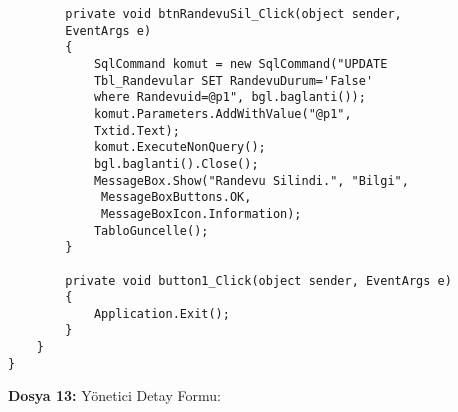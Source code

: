 \begin{lstlisting}
        private void btnRandevuSil_Click(object sender, 
        EventArgs e)
        {
            SqlCommand komut = new SqlCommand("UPDATE 
            Tbl_Randevular SET RandevuDurum='False' 
            where Randevuid=@p1", bgl.baglanti());
            komut.Parameters.AddWithValue("@p1", 
            Txtid.Text);
            komut.ExecuteNonQuery();
            bgl.baglanti().Close();
            MessageBox.Show("Randevu Silindi.", "Bilgi",
             MessageBoxButtons.OK, 
             MessageBoxIcon.Information);
            TabloGuncelle();
        }

        private void button1_Click(object sender, EventArgs e)
        {
            Application.Exit();
        }
    }
}
\end{lstlisting}

\textbf{Dosya 13:} Yönetici Detay Formu:

